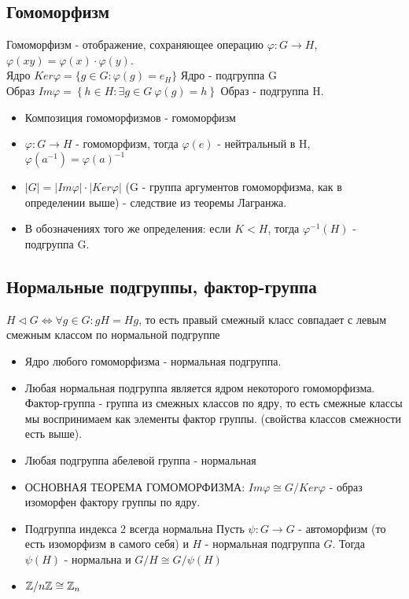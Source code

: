 \documentclass[11pt,a4paper]{article}
\begin{document}
		\subsection*{ Гомоморфизм} Гомоморфизм - отображение, сохраняющее операцию $\varphi: G \rightarrow H$, $\varphi(xy) = \varphi(x) \cdot \varphi(y) $. \\ 
		Ядро $Ker \varphi = \{g \in G:  \varphi(g) = e_H\}  $ Ядро - подгруппа G \\
		Образ $Im \varphi = \left\{h \in H: \exists g \in G \ \varphi(g) = h\right\}$ Образ - подгруппа H. \\
		\begin{itemize}
			\item Композиция гомоморфизмов - гомоморфизм
			\item $\varphi: G \rightarrow H$ - гомоморфизм, тогда $\varphi(e)$ - нейтральный в H, \newline $\varphi(a^{-1}) = \varphi(a)^{-1} $
			\item $|G| = |Im \varphi| \cdot |Ker \varphi|$ (G - группа аргументов гомоморфизма, как в определении выше) - следствие из теоремы Лагранжа.
			\item В обозначениях того же определения: если $K < H$, тогда $\varphi^{-1}(H)$ - подгруппа G.
		\end{itemize}
		
		\subsection*{ Нормальные подгруппы, фактор-группа}
		$H \vartriangleleft G \Leftrightarrow \forall g \in G: gH = Hg$, то есть правый смежный класс совпадает с левым смежным классом по нормальной подгруппе
		\begin{itemize}
			\item Ядро любого гомоморфизма - нормальная подгруппа.
			\item Любая нормальная подгруппа является  ядром некоторого гомоморфизма. 
			Фактор-группа - группа из смежных классов по ядру, то есть смежные классы мы воспринимаем как элементы фактор группы. (свойства классов смежности есть выше).
			\item Любая подгруппа абелевой группа - нормальная
			\item ОСНОВНАЯ ТЕОРЕМА ГОМОМОРФИЗМА: $Im \varphi \cong G/Ker \varphi$ - образ изоморфен фактору группы по ядру. 
			\item Подгруппа индекса 2 всегда нормальна
			Пусть $\psi: G \rightarrow G$ - автоморфизм (то есть изоморфизм в самого себя) и $H$ - нормальная подгруппа $G$. Тогда $\psi(H)$ - нормальна и $G/H \cong G/\psi(H)$
			\item $\mathbb{Z}/n\mathbb{Z} \cong \mathbb{Z}_n$
			
		\end{itemize}
		
\end{document}
